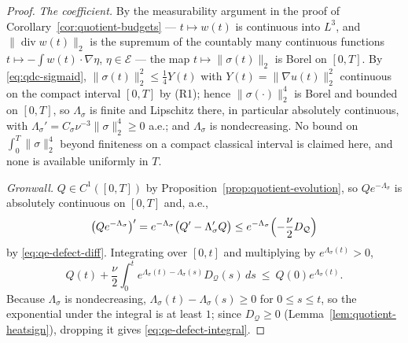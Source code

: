 \documentclass[11pt]{article}
\theoremstyle{definition}
\theoremstyle{plain}
\newcommand{\norm}[1]{\lVert #1\rVert}
\begin{document}
\begin{proof}
\emph{The coefficient.}  By the measurability argument in the proof of
Corollary~\ref{cor:quotient-budgets} --- $t\mapsto w(t)$ is continuous into
$L^3$, and $\norm{\operatorname{div}w(t)}_2$ is the supremum of the
countably many continuous functions
$t\mapsto-\int w(t)\cdot\nabla\eta$, $\eta\in\mathcal E$ --- the map
$t\mapsto\norm{\sigma(t)}_2$ is Borel on $[0,T]$.  By
\eqref{eq:qdc-sigmaid}, $\norm{\sigma(t)}_2^2\le\frac14Y(t)$ with
$Y(t)=\norm{\nabla u(t)}_2^2$ continuous on the compact interval $[0,T]$ by
(R1); hence $\norm{\sigma(\cdot)}_2^4$ is Borel and bounded on $[0,T]$, so
$\Lambda_\sigma$ is finite and Lipschitz there, in particular absolutely
continuous, with $\Lambda_\sigma'=C_\sigma\nu^{-3}\norm\sigma_2^4\ge0$
a.e.; and $\Lambda_\sigma$ is nondecreasing.  No bound on
$\int_0^T\norm\sigma_2^4$ beyond finiteness on a compact classical
interval is claimed here, and none is available uniformly in $T$.

\emph{Gronwall.}  $Q\in C^1([0,T])$ by
Proposition~\ref{prop:quotient-evolution}, so $Qe^{-\Lambda_\sigma}$ is
absolutely continuous on $[0,T]$ and, a.e.,
\[
 \bigl(Qe^{-\Lambda_\sigma}\bigr)'
 =e^{-\Lambda_\sigma}\bigl(Q'-\Lambda_\sigma'Q\bigr)
 \le e^{-\Lambda_\sigma}\Bigl(-\frac\nu2D_{\mathcal Q}\Bigr)
\]
by \eqref{eq:qe-defect-diff}.  Integrating over $[0,t]$ and multiplying by
$e^{\Lambda_\sigma(t)}>0$,
\[
 Q(t)+\frac\nu2\int_0^te^{\Lambda_\sigma(t)-\Lambda_\sigma(s)}D_{\mathcal Q}(s)\,ds
 \ \le\ Q(0)e^{\Lambda_\sigma(t)} .
\]
Because $\Lambda_\sigma$ is nondecreasing,
$\Lambda_\sigma(t)-\Lambda_\sigma(s)\ge0$ for $0\le s\le t$, so the
exponential under the integral is at least $1$; since
$D_{\mathcal Q}\ge0$ (Lemma~\ref{lem:quotient-heatsign}), dropping it
gives \eqref{eq:qe-defect-integral}.
\end{proof}

\end{document}
